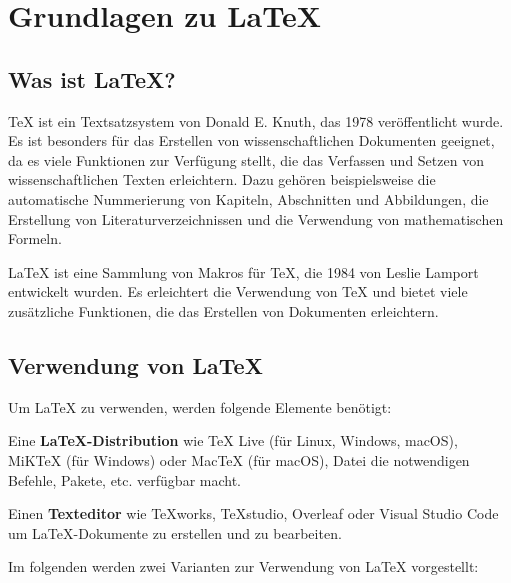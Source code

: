 \section{Grundlagen zu \LaTeX{}}
\label{sec:grundlagen}

\subsection{Was ist \LaTeX{}?}
\label{sec:was_ist_latex}

\TeX{} ist ein Textsatzsystem von Donald E. Knuth, das 1978 veröffentlicht wurde. Es ist besonders für das Erstellen von wissenschaftlichen Dokumenten geeignet, da es viele Funktionen zur Verfügung stellt, die das Verfassen und Setzen von wissenschaftlichen Texten erleichtern. Dazu gehören beispielsweise die automatische Nummerierung von Kapiteln, Abschnitten und Abbildungen, die Erstellung von Literaturverzeichnissen und die Verwendung von mathematischen Formeln.

\LaTeX{} ist eine Sammlung von Makros für \TeX{}, die 1984 von Leslie Lamport entwickelt wurden. Es erleichtert die Verwendung von \TeX{} und bietet viele zusätzliche Funktionen, die das Erstellen von Dokumenten erleichtern.


\subsection{Verwendung von \LaTeX{}}
\label{sec:verwendung_von_latex}
Um \LaTeX{} zu verwenden, werden folgende Elemente benötigt:

Eine \textbf{\LaTeX{}-Distribution} wie TeX Live (für Linux, Windows, macOS), MiKTeX (für Windows) oder MacTeX (für macOS), Datei die notwendigen Befehle, Pakete, etc. verfügbar macht.

Einen \textbf{Texteditor} wie TeXworks, TeXstudio, Overleaf oder Visual Studio Code um \LaTeX{}-Dokumente zu erstellen und zu bearbeiten.

Im folgenden werden zwei Varianten zur Verwendung von \LaTeX{} vorgestellt:

